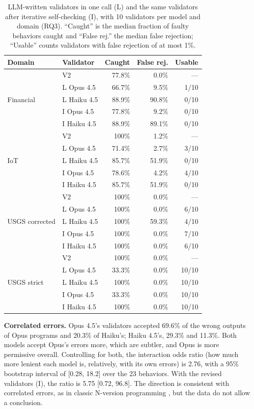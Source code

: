 \documentclass[sigconf,nonacm]{acmart}
\begin{document}
\begin{table}[t]
\caption{LLM-written validators in one call (L) and the same validators after iterative self-checking (I), with 10 validators per model and domain (RQ3). ``Caught'' is the median fraction of faulty behaviors caught and ``False rej.'' the median false rejection; ``Usable'' counts validators with false rejection of at most 1\%.}
\label{tab:rq3}
\small
\begin{tabular}{llrrr}
\toprule
Domain & Validator & Caught & False rej. & Usable \\
\midrule
\multirow{5}{*}{Financial} & V2 & 77.8\% & 0.0\% & --- \\
 & L Opus 4.5 & 66.7\% & 9.5\% & 1/10 \\
 & L Haiku 4.5 & 88.9\% & 90.8\% & 0/10 \\
 & I Opus 4.5 & 77.8\% & 9.2\% & 0/10 \\
 & I Haiku 4.5 & 88.9\% & 89.1\% & 0/10 \\
\midrule
\multirow{5}{*}{IoT} & V2 & 100\% & 1.2\% & --- \\
 & L Opus 4.5 & 71.4\% & 2.7\% & 3/10 \\
 & L Haiku 4.5 & 85.7\% & 51.9\% & 0/10 \\
 & I Opus 4.5 & 78.6\% & 4.2\% & 4/10 \\
 & I Haiku 4.5 & 85.7\% & 51.9\% & 0/10 \\
\midrule
\multirow{5}{*}{USGS corrected} & V2 & 100\% & 0.0\% & --- \\
 & L Opus 4.5 & 100\% & 0.0\% & 6/10 \\
 & L Haiku 4.5 & 100\% & 59.3\% & 4/10 \\
 & I Opus 4.5 & 100\% & 0.0\% & 7/10 \\
 & I Haiku 4.5 & 100\% & 0.0\% & 6/10 \\
\midrule
\multirow{5}{*}{USGS strict} & V2 & 100\% & 0.0\% & --- \\
 & L Opus 4.5 & 33.3\% & 0.0\% & 10/10 \\
 & L Haiku 4.5 & 100\% & 0.0\% & 10/10 \\
 & I Opus 4.5 & 33.3\% & 0.0\% & 10/10 \\
 & I Haiku 4.5 & 100\% & 0.0\% & 10/10 \\
\bottomrule
\end{tabular}
\end{table}

\textbf{Correlated errors.} Opus 4.5's validators accepted 69.6\% of the wrong outputs of Opus programs and 20.3\% of Haiku's; Haiku 4.5's, 29.3\% and 11.3\%. Both models accept Opus's errors more, which are subtler, and Opus is more permissive overall. Controlling for both, the interaction odds ratio (how much more lenient each model is, relatively, with its own errors) is 2.76, with a 95\% bootstrap interval of [0.28, 18.2] over the 23 behaviors. With the revised validators (I), the ratio is 5.75 [0.72, 96.8]. The direction is consistent with correlated errors, as in classic N-version programming \cite{knight1986experimental}, but the data do not allow a conclusion.
\end{document}

